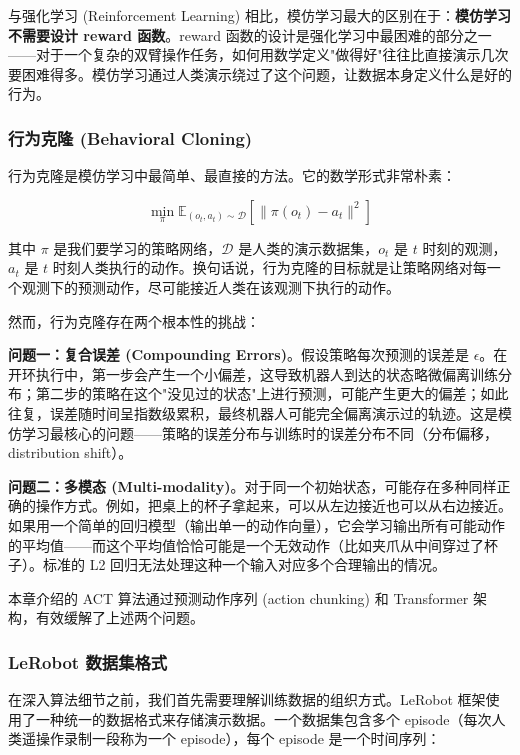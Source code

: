 \documentclass[UTF8,a4paper,11pt]{ctexart}
\begin{document}
{与强化学习 (Reinforcement Learning) 相比，模仿学习最大的区别在于：\textbf{模仿学习不需要设计 reward 函数}。reward 函数的设计是强化学习中最困难的部分之一——对于一个复杂的双臂操作任务，如何用数学定义"做得好"往往比直接演示几次要困难得多。模仿学习通过人类演示绕过了这个问题，让数据本身定义什么是好的行为。

\subsubsection{行为克隆 (Behavioral Cloning)}

行为克隆是模仿学习中最简单、最直接的方法。它的数学形式非常朴素：

$$\min_{\pi} \mathbb{E}_{(o_t, a_t) \sim \mathcal{D}} \left[ \|\pi(o_t) - a_t\|^2 \right]$$

其中 $\pi$ 是我们要学习的策略网络，$\mathcal{D}$ 是人类的演示数据集，$o_t$ 是 $t$ 时刻的观测，$a_t$ 是 $t$ 时刻人类执行的动作。换句话说，行为克隆的目标就是让策略网络对每一个观测下的预测动作，尽可能接近人类在该观测下执行的动作。

然而，行为克隆存在两个根本性的挑战：

\textbf{问题一：复合误差 (Compounding Errors)}。假设策略每次预测的误差是 $\epsilon$。在开环执行中，第一步会产生一个小偏差，这导致机器人到达的状态略微偏离训练分布；第二步的策略在这个"没见过的状态"上进行预测，可能产生更大的偏差；如此往复，误差随时间呈指数级累积，最终机器人可能完全偏离演示过的轨迹。这是模仿学习最核心的问题——策略的误差分布与训练时的误差分布不同（分布偏移，distribution shift）。

\textbf{问题二：多模态 (Multi-modality)}。对于同一个初始状态，可能存在多种同样正确的操作方式。例如，把桌上的杯子拿起来，可以从左边接近也可以从右边接近。如果用一个简单的回归模型（输出单一的动作向量），它会学习输出所有可能动作的平均值——而这个平均值恰恰可能是一个无效动作（比如夹爪从中间穿过了杯子）。标准的 L2 回归无法处理这种一个输入对应多个合理输出的情况。

本章介绍的 ACT 算法通过预测动作序列 (action chunking) 和 Transformer 架构，有效缓解了上述两个问题。

\subsubsection{LeRobot 数据集格式}

在深入算法细节之前，我们首先需要理解训练数据的组织方式。LeRobot 框架使用了一种统一的数据格式来存储演示数据。一个数据集包含多个 episode（每次人类遥操作录制一段称为一个 episode），每个 episode 是一个时间序列：

}
\end{document}
